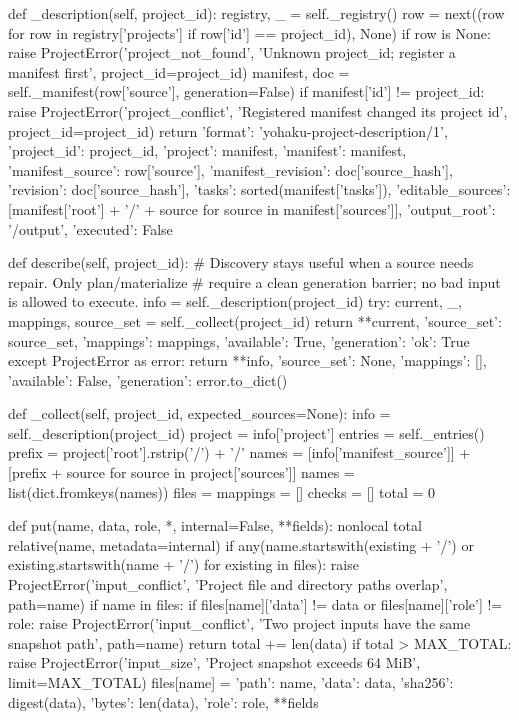     def _description(self, project_id):
        registry, _ = self._registry()
        row = next((row for row in registry['projects'] if row['id'] == project_id), None)
        if row is None:
            raise ProjectError('project_not_found', 'Unknown project_id; register a manifest first', project_id=project_id)
        manifest, doc = self._manifest(row['source'], generation=False)
        if manifest['id'] != project_id:
            raise ProjectError('project_conflict', 'Registered manifest changed its project id', project_id=project_id)
        return {'format': 'yohaku-project-description/1', 'project_id': project_id,
                'project': manifest, 'manifest': manifest, 'manifest_source': row['source'],
                'manifest_revision': doc['source_hash'], 'revision': doc['source_hash'], 'tasks': sorted(manifest['tasks']),
                'editable_sources': [manifest['root'] + '/' + source for source in manifest['sources']],
                'output_root': '/output', 'executed': False}

    def describe(self, project_id):
        # Discovery stays useful when a source needs repair. Only plan/materialize
        # require a clean generation barrier; no bad input is allowed to execute.
        info = self._description(project_id)
        try:
            current, _, mappings, source_set = self._collect(project_id)
            return {**current, 'source_set': source_set, 'mappings': mappings,
                    'available': True, 'generation': {'ok': True}}
        except ProjectError as error:
            return {**info, 'source_set': None, 'mappings': [], 'available': False,
                    'generation': error.to_dict()}

    def _collect(self, project_id, expected_sources=None):
        info = self._description(project_id)
        project = info['project']
        entries = self._entries()
        prefix = project['root'].rstrip('/') + '/'
        names = [info['manifest_source']] + [prefix + source for source in project['sources']]
        names = list(dict.fromkeys(names))
        files = {}
        mappings = []
        checks = []
        total = 0

        def put(name, data, role, *, internal=False, **fields):
            nonlocal total
            relative(name, metadata=internal)
            if any(name.startswith(existing + '/') or existing.startswith(name + '/') for existing in files):
                raise ProjectError('input_conflict', 'Project file and directory paths overlap', path=name)
            if name in files:
                if files[name]['data'] != data or files[name]['role'] != role:
                    raise ProjectError('input_conflict', 'Two project inputs have the same snapshot path', path=name)
                return
            total += len(data)
            if total > MAX_TOTAL:
                raise ProjectError('input_size', 'Project snapshot exceeds 64 MiB', limit=MAX_TOTAL)
            files[name] = {'path': name, 'data': data, 'sha256': digest(data),
                           'bytes': len(data), 'role': role, **fields}

